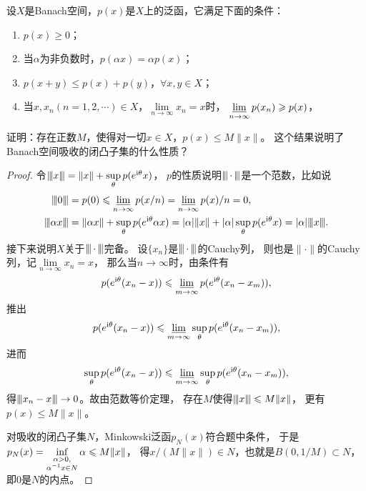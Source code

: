 \begin{19}
    设$X$是Banach空间，$p(x)$是$X$上的泛函，它满足下面的条件：
    \begin{enumerate}[label=(\roman*)]
    \item $p(x)\geqslant0$；
    \item 当$\alpha$为非负数时，$p(\alpha x)=\alpha p(x)$；
    \item $p(x+y)\leqslant p(x)+p(y)$，$\forall x,y\in X$；
    \item 当$x,x_n(n=1,2,\cdots)\in X$，$\lim\limits_{n\to\infty}x_n=x$时，
    $\varliminf\limits_{n\to\infty}p(x_n)\geqslant p(x)$，
    \end{enumerate}
    证明：存在正数$M$，使得对一切$x\in X$，$p(x)\leqslant M\|x\|$。
    这个结果说明了Banach空间吸收的闭凸子集的什么性质？
\end{19}
\begin{proof}
    令$\norm{x}=\|x\|+\sup\limits_{\theta}p(e^{{\rm i}\theta}x)$，
    $p$的性质说明$\norm{\,\cdot\,}$是一个范数，比如说
    \begin{align*}
        \norm{0}&=p(0)\leqslant\varliminf_{n\to\infty}p(x/n)
        =\varliminf\limits_{n\to\infty}p(x)/n=0,\\
        \norm{\alpha x}&=\|\alpha x\|+\sup_{\theta}p(e^{{\rm i}\theta}\alpha x)
        =|\alpha|\|x\|+|\alpha|\sup_{\theta}p(e^{{\rm i}\theta}x)
        =|\alpha|\norm{x}.
    \end{align*}
    接下来说明$X$关于$\norm{\,\cdot\,}$完备。
    设$\{x_n\}$是$\norm{\,\cdot\,}$的Cauchy列，
    则也是$\|\cdot\|$的Cauchy列，记$\lim\limits_{n\to\infty}x_n=x$，
    那么当$n\to\infty$时，由条件有
    $$p(e^{{\rm i}\theta}(x_n-x))\leqslant
    \varliminf_{m\to\infty}p(e^{{\rm i}\theta}(x_n-x_m)),$$
    推出
    $$p(e^{{\rm i}\theta}(x_n-x))\leqslant
    \varliminf_{m\to\infty}\sup_{\theta}p(e^{{\rm i}\theta}(x_n-x_m)),$$
    进而
    $$\sup_{\theta}p(e^{{\rm i}\theta}(x_n-x))\leqslant
    \varliminf_{m\to\infty}\sup_{\theta}p(e^{{\rm i}\theta}(x_n-x_m)),$$
    得$\norm{x_n-x}\to0$。故由范数等价定理，
    存在$M$使得$\norm{x}\leqslant M\|x\|$，
    更有$p(x)\leqslant M\|x\|$。

    对吸收的闭凸子集$N$，Minkowski泛函$p_N(x)$符合题中条件，
    于是$p_N(x)=\inf\limits_{\begin{subarray}{c}\alpha>0,\\\alpha^{-1}x\in N\end{subarray}}\alpha\leqslant M\|x\|$，
    得$x/(M\|x\|)\in N$，也就是$B(0,1/M)\subset N$，即$0$是$N$的内点。
\end{proof}

